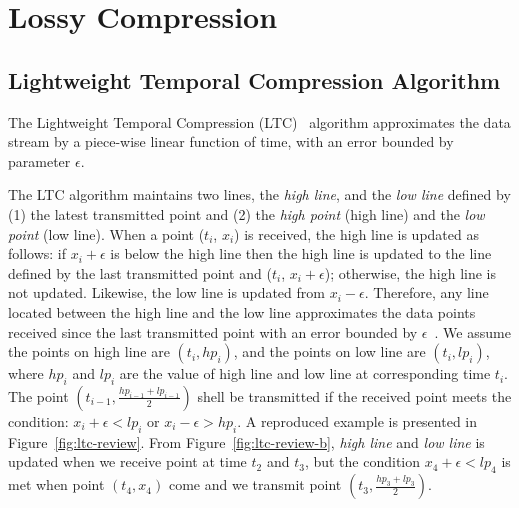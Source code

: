 \section{Lossy Compression}



\subsection{Lightweight Temporal Compression Algorithm}
\label{sec:ltc}

The Lightweight Temporal Compression (LTC)~\cite{schoellhammer2004lightweight}
algorithm approximates the data stream by a piece-wise linear function of time,
with an error bounded by parameter $\epsilon$.

The LTC algorithm maintains two lines, the \emph{high line}, and the \emph{low
line} defined by (1) the latest transmitted point and (2) the \emph{high point}
(high line) and the \emph{low point} (low line). When a point ($t_i$, $x_i$) is
received, the high line is updated as follows: if $x_i+\epsilon$ is below the
high line then the high line is updated to the line defined by the last
transmitted point and ($t_i$, $x_i+\epsilon$); otherwise, the high line is not
updated. Likewise, the low line is updated from $x_i-\epsilon$. Therefore, any
line located between the high line and the low line approximates the data points
received since the last transmitted point with an error bounded by
$\epsilon$~\cite{schoellhammer2004lightweight}. We assume the points on high
line are $(t_i, hp_i)$, and the points on low line are $(t_i, lp_i)$, where
$hp_i$ and $lp_i$ are the value of high line and low line at corresponding time
$t_i$.
The point $(t_{i-1}, \frac{hp_{i-1}+lp_{i-1}}{2})$ shell be transmitted if the
received point meets the condition: $x_i+\epsilon < lp_{i}$ or $x_i-\epsilon >
hp_{i}$. A reproduced example is presented in Figure~\ref{fig:ltc-review}. From
Figure~\ref{fig:ltc-review-b}, \emph{high line} and \emph{low line} is updated
when we receive point at time $t_2$ and $t_3$, but the condition $x_4+\epsilon <
lp_{4}$ is met when point $(t_4, x_4)$ come and we transmit point $(t_3,
\frac{hp_{3}+lp_{3}}{2})$.

